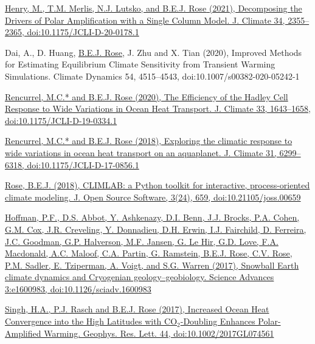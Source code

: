 \documentclass[11pt, letterpaper]{article} %
\newcommand{\years}[1]{\marginnote{\scriptsize #1}} %
\newcommand{\publink}{http://www.atmos.albany.edu/facstaff/brose/resources/Publications/}
\begin{document}
\href{\publink Henry_etal_JClim2021.pdf}{Henry, M., T.M. Merlis, N.J. Lutsko, and \underline{B.E.J. Rose} (2021), Decomposing the Drivers of Polar Amplification with a Single Column Model. J. Climate 34, 2355--2365, doi:10.1175/JCLI-D-20-0178.1}
\vspace{0.2 cm}

\years{2020} 
Dai, A., D. Huang, \underline{B.E.J. Rose}, J. Zhu and X. Tian (2020), Improved Methods for Estimating Equilibrium Climate Sensitivity from Transient Warming Simulations. Climate Dynamics 54, 4515--4543, doi:10.1007/s00382-020-05242-1
\vspace{0.2 cm}

\href{\publink Rencurrel_Rose_JClim2020.pdf}{Rencurrel, M.C.* and \underline{B.E.J. Rose} (2020), The Efficiency of the Hadley Cell Response to Wide Variations in Ocean Heat Transport. J. Climate 33, 1643--1658, doi:10.1175/JCLI-D-19-0334.1}
\vspace{0.2 cm}

\years{2018} 
\href{\publink Rencurrel_Rose_jcli-d-17-0856.1.pdf}{Rencurrel, M.C.* and \underline{B.E.J. Rose} (2018), Exploring the climatic response to wide variations in ocean heat transport on an aquaplanet. J. Climate 31, 6299--6318, doi:10.1175/JCLI-D-17-0856.1} 
\vspace{0.2 cm}

\href{\publink Rose_JOSS2018.pdf}{\underline{Rose, B.E.J.} (2018), CLIMLAB: a Python toolkit for interactive, process-oriented climate modeling. J. Open Source Software, 3(24), 659, doi:10.21105/joss.00659}
\vspace{0.2 cm}

\years{2017} 
\href{http://advances.sciencemag.org/content/3/11/e1600983}{Hoffman, P.F., D.S. Abbot, Y. Ashkenazy, D.I. Benn, J.J. Brocks, P.A. Cohen, G.M. Cox, J.R. Creveling, Y. Donnadieu, D.H. Erwin, I.J. Fairchild, D. Ferreira, J.C. Goodman, G.P. Halverson, M.F. Jansen, G. Le Hir, G.D. Love, F.A. Macdonald, A.C. Maloof, C.A. Partin, G. Ramstein, \underline{B.E.J. Rose}, C.V. Rose, P.M. Sadler, E. Tziperman, A. Voigt, and S.G. Warren (2017), Snowball Earth climate dynamics and Cryogenian geology--geobiology. Science Advances 3:e1600983, doi:10.1126/sciadv.1600983}
\vspace{0.2 cm}

\href{\publink Singh_et_al-2017-Geophysical_Research_Letters-2.pdf}{Singh, H.A., P.J. Rasch and \underline{B.E.J. Rose} (2017), Increased Ocean Heat Convergence into the High Latitudes with CO$_2$-Doubling Enhances Polar-Amplified Warming. Geophys. Res. Lett. 44, doi:10.1002/2017GL074561}
\vspace{0.2 cm}
\end{document}
